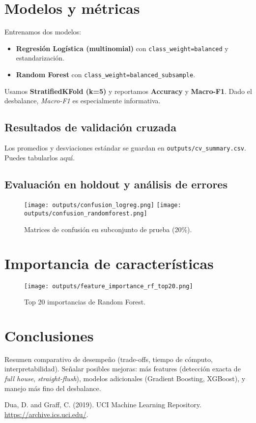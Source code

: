 \documentclass[11pt]{article}
\begin{document}
\section{Modelos y métricas}
Entrenamos dos modelos:
\begin{itemize}
  \item \textbf{Regresión Logística (multinomial)} con \texttt{class\_weight=balanced} y estandarización.
  \item \textbf{Random Forest} con \texttt{class\_weight=balanced\_subsample}.
\end{itemize}

Usamos \textbf{StratifiedKFold (k=5)} y reportamos \textbf{Accuracy} y \textbf{Macro-F1}. Dado el desbalance, \textit{Macro-F1} es especialmente informativa.

\subsection{Resultados de validación cruzada}
Los promedios y desviaciones estándar se guardan en \texttt{outputs/cv\_summary.csv}. Puedes tabularlos aquí.

\subsection{Evaluación en holdout y análisis de errores}
\begin{figure}[h]
  \centering
  \texttt{[image: outputs/confusion\_logreg.png]}
  \texttt{[image: outputs/confusion\_randomforest.png]}
  \caption{Matrices de confusión en subconjunto de prueba (20\%).}
\end{figure}

\section{Importancia de características}
\begin{figure}[h]
  \centering
  \texttt{[image: outputs/feature\_importance\_rf\_top20.png]}
  \caption{Top 20 importancias de Random Forest.}
\end{figure}

\section{Conclusiones}
Resumen comparativo de desempeño (trade-offs, tiempo de cómputo, interpretabilidad). Señalar posibles mejoras: más features (detección exacta de \emph{full house}, \emph{straight-flush}), modelos adicionales (Gradient Boosting, XGBoost), y manejo más fino del desbalance.


\begin{thebibliography}{9}
Dua, D. and Graff, C. (2019). UCI Machine Learning Repository. \url{https://archive.ics.uci.edu/}.
\end{thebibliography}
\end{document}
